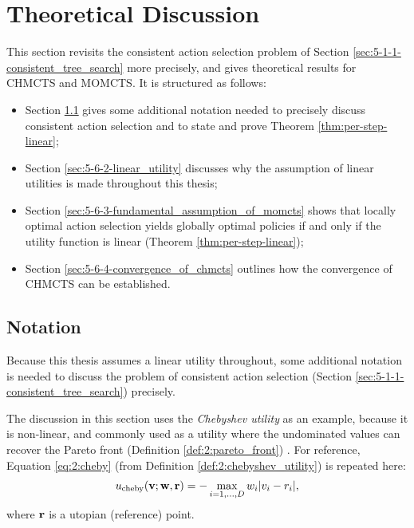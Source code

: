\section{Theoretical Discussion}
\label{sec:5-6-theory}

    This section revisits the consistent action selection problem of Section \ref{sec:5-1-1-consistent_tree_search} more precisely, and gives theoretical results for CHMCTS and MOMCTS. It is structured as follows:
    \begin{itemize}
        \item Section \ref{sec:5-6-1-notation} gives some additional notation needed to precisely discuss consistent action selection and to state and prove Theorem \ref{thm:per-step-linear};
        \item Section \ref{sec:5-6-2-linear_utility} discusses why the assumption of linear utilities is made throughout this thesis;
        \item Section \ref{sec:5-6-3-fundamental_assumption_of_momcts} shows that locally optimal action selection yields globally optimal policies if and only if the utility function is linear (Theorem \ref{thm:per-step-linear});
        \item Section \ref{sec:5-6-4-convergence_of_chmcts} outlines how the convergence of CHMCTS can be established.
    \end{itemize}



\subsection{Notation}
\label{sec:5-6-1-notation}

    Because this thesis assumes a linear utility throughout, some additional notation is needed to discuss the problem of consistent action selection (Section \ref{sec:5-1-1-consistent_tree_search}) precisely.

    The discussion in this section uses the \textit{Chebyshev utility} as an example, because it is non-linear, and commonly used as a utility where the undominated values can recover the Pareto front (Definition \ref{def:2:pareto_front}) \cite{moo_chebyshev}. For reference, Equation \eqref{eq:2:cheby} (from Definition \ref{def:2:chebyshev_utility}) is repeated here:
    \begin{align}
        {u_{\textnormal{cheby}}}(\mathbf{v};\mathbf{w},\mathbf{r}) = - \max_{i=1,\ldots,D} w_i |v_i - r_i|, \label{eq:5:cheby}
    \end{align}
    where $\mathbf{r}$ is a utopian (reference) point.

